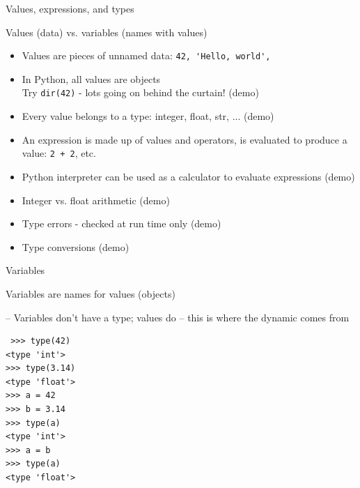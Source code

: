 \documentclass{beamer}
\begin{document}
\begin{frame}[fragile]{Values, expressions, and types}

{\large Values (data) vs. variables (names with values)}

\begin{itemize}
    \item  Values are pieces of unnamed data: \verb+42, 'Hello, world',+

    \item  In Python, all values are objects\\
      Try \verb+dir(42)+ - lots going on behind the curtain! (demo)

    \item  Every value belongs to a type: integer, float, str, ...  (demo)

    \item  An expression is made up of values and operators, is evaluated to
        produce a value:  \verb!2 + 2!, etc.

    \item  Python interpreter can be used as a calculator to evaluate expressions (demo)

    \item  Integer vs. float arithmetic (demo)

    \item  Type errors - checked at run time only (demo)
  
    \item  Type conversions (demo)
\end{itemize}

\end{frame}

\begin{frame}[fragile]{Variables}

{\large Variables are names for values (objects)}

-- Variables don't have a type; values do -- 
this is where the dynamic comes from

\begin{verbatim}
￼>>> type(42)
<type 'int'>
>>> type(3.14)
<type 'float'>
>>> a = 42
>>> b = 3.14
>>> type(a)
<type 'int'>
>>> a = b
>>> type(a)
<type 'float'>
\end{verbatim}

\end{frame}
\end{document}
